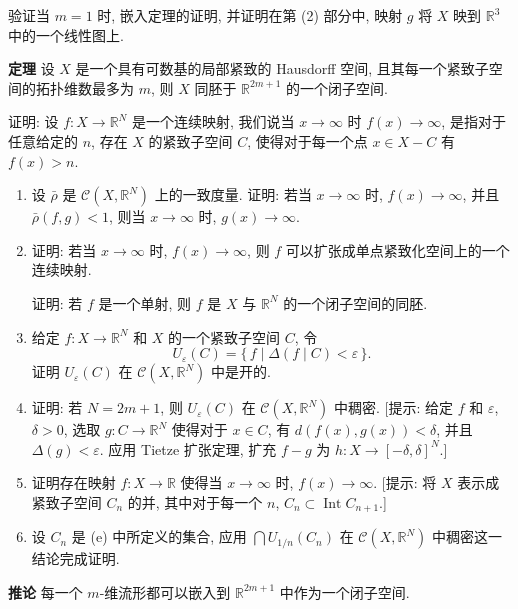 \begin{exercise}
验证当 $m=1$ 时, 嵌入定理的证明, 并证明在第 (2) 部分中, 映射 $g$ 将 $X$ 映到 $\mathbb{R}^{3}$ 中的一个线性图上.
\end{exercise}

\begin{exercise}
\textbf{定理} 设 $X$ 是一个具有可数基的局部紧致的 Hausdorff 空间, 且其每一个紧致子空间的拓扑维数最多为 $m$, 则 $X$ 同胚于 $\mathbb{R}^{2m+1}$ 的一个闭子空间.

证明: 设 $f\colon X\to\mathbb{R}^{N}$ 是一个连续映射, 我们说当 $x\to\infty$ 时 $f(x)\to\infty$, 是指对于任意给定的 $n$, 存在 $X$ 的紧致子空间 $C$, 使得对于每一个点 $x\in X-C$ 有 $f(x)>n$.
\begin{enumerate}
\item 设 $\bar{\rho}$ 是 $\mathcal{C}(X,\mathbb{R}^{N})$ 上的一致度量. 证明: 若当 $x\to\infty$ 时, $f(x)\to\infty$, 并且 $\bar{\rho}(f,g)<1$, 则当 $x\to\infty$ 时, $g(x)\to\infty$.
\item 证明: 若当 $x\to\infty$ 时, $f(x)\to\infty$, 则 $f$ 可以扩张成单点紧致化空间上的一个连续映射.

证明: 若 $f$ 是一个单射, 则 $f$ 是 $X$ 与 $\mathbb{R}^{N}$ 的一个闭子空间的同胚.
\item 给定 $f\colon X\to\mathbb{R}^{N}$ 和 $X$ 的一个紧致子空间 $C$, 令
\[
U_{\varepsilon}(C)=\{\,f\mid\Delta(f\mid C)<\varepsilon\,\}.
\]
证明 $U_\varepsilon(C)$ 在 $\mathcal{C}(X,\mathbb{R}^{N})$ 中是开的.
\item 证明: 若 $N=2m+1$, 则 $U_\varepsilon(C)$ 在 $\mathcal{C}(X,\mathbb{R}^{N})$ 中稠密. [提示: 给定 $f$ 和 $\varepsilon$, $\delta>0$, 选取 $g\colon C\to\mathbb{R}^{N}$ 使得对于 $x\in C$, 有 $d(f(x),g(x))<\delta$, 并且 $\Delta(g)<\varepsilon$. 应用 Tietze 扩张定理, 扩充 $f-g$ 为 $h\colon X\to[-\delta,\delta]^{N}$.]
\item 证明存在映射 $f\colon X\to\mathbb{R}$ 使得当 $x\to\infty$ 时, $f(x)\to\infty$. [提示: 将 $X$ 表示成紧致子空间 $C_n$ 的并, 其中对于每一个 $n$, $C_n\subset\operatorname{Int}C_{n+1}$.]
\item 设 $C_n$ 是 (e) 中所定义的集合, 应用 $\bigcap U_{1/n}(C_n)$ 在 $\mathcal{C}(X,\mathbb{R}^{N})$ 中稠密这一结论完成证明.
\end{enumerate}
\end{exercise}

\begin{exercise}
\textbf{推论} 每一个 $m$-维流形都可以嵌入到 $\mathbb{R}^{2m+1}$ 中作为一个闭子空间.
\end{exercise}

